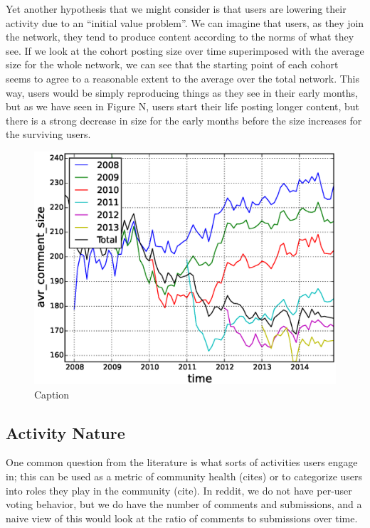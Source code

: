 Yet another hypothesis that we might consider is that users are lowering their activity due to an ``initial value problem''. We can imagine that users, as they join the network, they tend to produce content according to the norms of what they see. If we look at the cohort posting size over time superimposed with the average size for the whole network, we can see that the starting point of each cohort seems to agree to a reasonable extent to the average over the total network. This way, users would be simply reproducing things as they see in their early months, but as we have seen in Figure N, users start their life posting longer content, but there is a strong decrease in size for the early months before the size increases for the surviving users.

\begin{figure}[!tb]
\centering
\includegraphics[scale=0.4]{./images/avr_comment_size_over_time_cohorts.eps}
\caption{Caption}
\label{fig:fig_label}
\end{figure}

\subsection{Activity Nature}

One common question from the literature is what sorts of activities users engage in; this can be used as a metric of community health (cites) or to categorize users into roles they play in the community (cite).  In reddit, we do not have per-user voting behavior, but we do have the number of comments and submissions, and a naive view of this would look at the ratio of comments to submissions over time.

